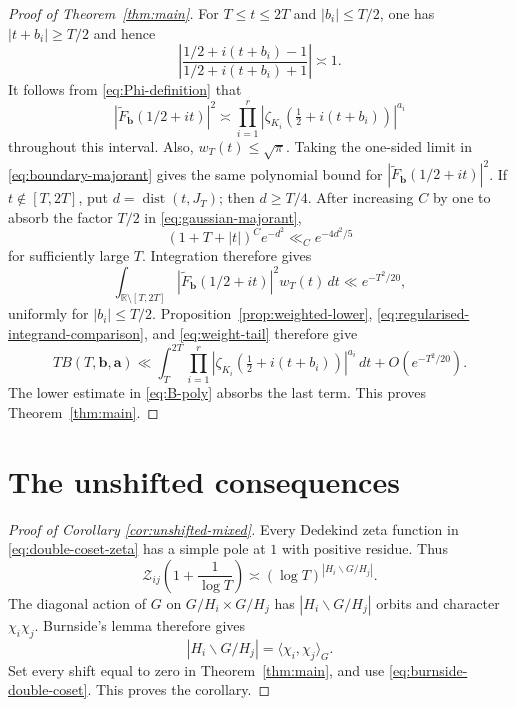 \documentclass[11pt]{amsart}
\numberwithin{equation}{section}
\theoremstyle{plain}
\newcommand{\R}{\mathbb{R}}
\newcommand{\calZ}{\mathcal{Z}}
\renewcommand{\tilde}{\widetilde}
\renewcommand{\le}{\leqslant}
\renewcommand{\ge}{\geqslant}
\begin{document}
\begin{proof}[Proof of Theorem~\ref{thm:main}]
For $T\le t\le2T$ and $|b_i|\le T/2$, one has $|t+b_i|\ge T/2$ and hence
\begin{equation*}
\left|\frac{1/2+i(t+b_i)-1}{1/2+i(t+b_i)+1}\right|\asymp1.
\end{equation*}
It follows from \eqref{eq:Phi-definition} that
\begin{equation}\label{eq:regularised-integrand-comparison}
|\tilde F_{\mathbf b}(1/2+it)|^2
\asymp
\prod_{i=1}^r
\left|\zeta_{K_i}\left(\tfrac12+i(t+b_i)\right)\right|^{a_i}
\end{equation}
throughout this interval.  Also, $w_T(t)\le\sqrt\pi$.  Taking the one-sided
limit in \eqref{eq:boundary-majorant} gives the same polynomial bound for
$|\tilde F_{\mathbf b}(1/2+it)|^2$.  If $t\notin[T,2T]$, put
$d=\operatorname{dist}(t,J_T)$; then $d\ge T/4$.  After increasing $C$ by
one to absorb the factor $T/2$ in
\eqref{eq:gaussian-majorant},
\begin{equation*}
(1+T+|t|)^C e^{-d^2}\ll_C e^{-4d^2/5}
\end{equation*}
for sufficiently large $T$.  Integration therefore gives
\begin{equation}\label{eq:weight-tail}
\int_{\R\setminus[T,2T]}
|\tilde F_{\mathbf b}(1/2+it)|^2w_T(t)\,dt
\ll e^{-T^2/20},
\end{equation}
uniformly for $|b_i|\le T/2$.  Proposition~\ref{prop:weighted-lower},
\eqref{eq:regularised-integrand-comparison}, and \eqref{eq:weight-tail}
therefore give
\begin{equation*}
TB(T,\mathbf b,\mathbf a)
\ll
\int_T^{2T}\prod_{i=1}^r
\left|\zeta_{K_i}\left(\tfrac12+i(t+b_i)\right)\right|^{a_i}\,dt
+O(e^{-T^2/20}).
\end{equation*}
The lower estimate in \eqref{eq:B-poly} absorbs the last term.  This proves
Theorem~\ref{thm:main}.
\end{proof}

\section{The unshifted consequences}\label{sec:corollaries}

\begin{proof}[Proof of Corollary \ref{cor:unshifted-mixed}]
Every Dedekind zeta function in \eqref{eq:double-coset-zeta} has a simple
pole at $1$ with positive residue.  Thus
\begin{equation*}
\calZ_{ij}\left(1+\frac1{\log T}\right)
\asymp (\log T)^{|H_i\backslash G/H_j|}.
\end{equation*}
The diagonal action of $G$ on $G/H_i\times G/H_j$ has
$|H_i\backslash G/H_j|$ orbits and character $\chi_i\chi_j$.
Burnside's lemma therefore gives
\begin{equation}\label{eq:burnside-double-coset}
|H_i\backslash G/H_j|
=\langle\chi_i,\chi_j\rangle_G.
\end{equation}
Set every shift equal to zero in Theorem~\ref{thm:main}, and use
\eqref{eq:burnside-double-coset}.  This proves the corollary.
\end{proof}
\end{document}
